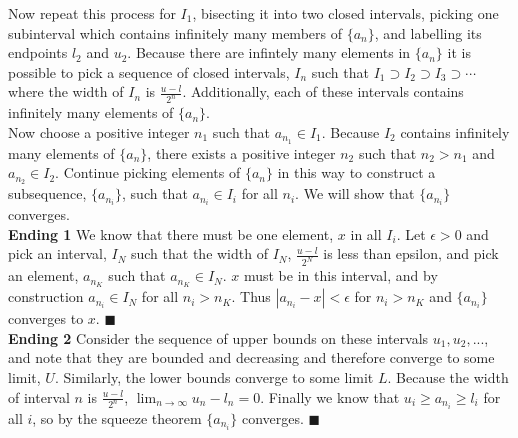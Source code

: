 \documentclass[12pt]{article}
\begin{document}
    Now repeat this process for $I_1$, bisecting it into two closed intervals, picking one subinterval which contains 
    infinitely many members of $\{a_n\}$, and labelling its endpoints $l_2$ and $u_2$. Because there are infintely many
    elements in $\{a_n\}$ it is possible to pick a sequence of closed intervals, $I_n$ such that $I_1 \supset I_2
    \supset I_3 \supset \cdots$ where the width of $I_n$ is $\frac{u-l}{2^n}$. Additionally, each of these intervals
    contains infinitely many elements of $\{a_n\}$.\\

    Now choose a positive integer $n_1$ such that $a_{n_1} \in I_1$. Because $I_2$ contains infinitely many elements 
    of $\{a_n\}$, there exists a positive integer $n_2$ such that $n_2 > n_1$ and $a_{n_2} \in I_2$. Continue picking
    elements of $\{a_n\}$ in this way to construct a subsequence, $\{a_{n_i}\}$, such that $a_{n_i} \in I_i$ for all $n_i$.
    We will show that $\{a_{n_i}\}$ converges.\\
    
    \textbf{Ending 1} We know that there must be one element, $x$ in all $I_i$. Let $\epsilon > 0$ and pick
    an interval, $I_N$ such that the width of $I_N$, $\frac{u - l}{2^N}$ is less than epsilon, and pick an 
    element, $a_{n_K}$ such that $a_{n_K} \in I_N$. $x$ must be in this interval, and by construction 
    $a_{n_i} \in I_N$ for all $n_i > n_K$. Thus $|a_{n_i} - x| < \epsilon$ for $n_i > n_K$ and $\{a_{n_i}\}$
    converges to $x$. $\blacksquare$\\

    \textbf{Ending 2} Consider the sequence of upper bounds on these intervals $u_1, u_2, ... $, and note that
    they are bounded and decreasing and therefore converge to some limit, $U$. Similarly, the lower bounds
    converge to some limit $L$. Because the width of interval $n$ is $\frac{u-l}{2^n}$, $\lim_{n \to \infty} u_n - l_n = 0$.
    Finally we know that $u_i \geq a_{n_i} \geq l_i$ for all $i$, so by the squeeze theorem $\{a_{n_i}\}$ converges. 
     $\blacksquare$
\end{document}
